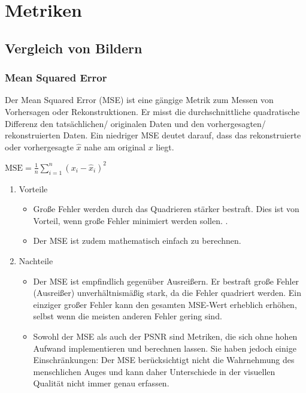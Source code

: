 \chapter{Metriken}
    \section{Vergleich von Bildern}
        \subsection{Mean Squared Error}
            Der Mean Squared Error (MSE) ist eine gängige Metrik zum Messen von Vorhersagen oder Rekonstruktionen.
            Er misst die durchschnittliche quadratische Differenz den tatsächlichen/ originalen Daten und den vorhergesagten/ rekonstruierten Daten.
            Ein niedriger MSE deutet darauf, dass das rekonstruierte oder vorhergesagte $\hat{x}$ nahe am original $x$ liegt.\bigskip
            \begin{center}
                $\text{MSE} = \frac{1}{n} \sum_{i=1}^{n} (x_i - \hat{x}_i)^2$
            \end{center}

            \begin{enumerate}
                \item Vorteile
                \begin{itemize}
                    \item Große Fehler werden durch das Quadrieren stärker bestraft. Dies ist von Vorteil, wenn große Fehler minimiert werden sollen. \cite{mse_builtin}.
                    \item Der MSE ist zudem mathematisch einfach zu berechnen.
                \end{itemize}
                \item Nachteile
                \begin{itemize}
                    \item Der MSE ist empfindlich gegenüber Ausreißern. Er bestraft große Fehler (Ausreißer) unverhältnismäßig stark, da die Fehler quadriert werden. Ein einziger großer Fehler kann den gesamten MSE-Wert erheblich erhöhen, selbst wenn die meisten anderen Fehler gering sind. \cite{mse_builtin}
                    \item             
                    Sowohl der MSE als auch der PSNR sind Metriken, die sich ohne hohen Aufwand
                    implementieren und berechnen lassen. Sie haben jedoch einige Einschränkungen: Der
                    MSE berücksichtigt nicht die Wahrnehmung des menschlichen Auges und kann daher
                    Unterschiede in der visuellen Qualität nicht immer genau erfassen. \cite{mse_psnr_eye}
                \end{itemize}
            \end{enumerate}


